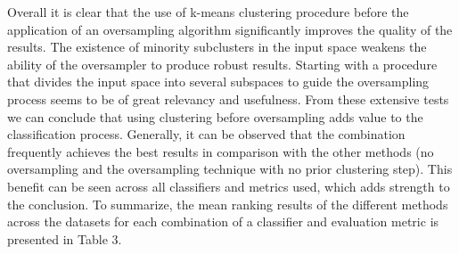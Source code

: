 \documentclass[parskip=full]{scrartcl}
\begin{document}
Overall it is clear that the use of k-means clustering procedure before the
application of an oversampling algorithm significantly improves the quality of
the results. The existence of minority subclusters in the input space weakens
the ability of the oversampler to produce robust results. Starting with a
procedure that divides the input space into several subspaces to guide the
oversampling process seems to be of great relevancy and usefulness. From these
extensive tests we can conclude that using clustering before oversampling adds
value to the classification process. Generally, it can be observed that the
combination frequently achieves the best results in comparison with the other
methods (no oversampling and the oversampling technique with no prior clustering
step). This benefit can be seen across all classifiers and metrics used, which
adds strength to the conclusion. To summarize, the mean ranking results of the
different methods across the datasets for each combination of a classifier and
evaluation metric is presented in Table 3.



\end{document}
